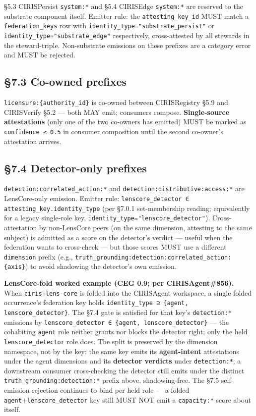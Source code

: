 \documentclass[10pt]{article}
\begin{document}
§5.3 CIRISPersist \texttt{system:*} and §5.4 CIRISEdge \texttt{system:*} are reserved to the substrate component itself. Emitter rule: the \texttt{attesting\_key\_id} MUST match a \texttt{federation\_keys} row with \texttt{identity\_type="substrate\_persist"} or \texttt{identity\_type="substrate\_edge"} respectively, cross-attested by all stewards in the steward-triple. Non-substrate emissions on these prefixes are a category error and MUST be rejected.


\subsection*{§7.3 Co-owned prefixes}


\texttt{licensure:\{authority\_id\}} is co-owned between CIRISRegistry §5.9 and CIRISVerify §5.2 — both MAY emit; consumers compose. \textbf{Single-source attestations} (only one of the two co-owners has emitted) MUST be marked as \texttt{confidence ≤ 0.5} in consumer composition until the second co-owner's attestation arrives.


\subsection*{§7.4 Detector-only prefixes}


\texttt{detection:correlated\_action:*} and \texttt{detection:distributive:access:*} are LensCore-only emission. Emitter rule: \texttt{lenscore\_detector ∈ attesting\_key.identity\_type} (per §7.0.1 set-membership reading; equivalently for a legacy single-role key, \texttt{identity\_type="lenscore\_detector"}). Cross-attestation by non-LensCore peers (on the same dimension, attesting to the same subject) is admitted as a score on the detector's verdict — useful when the federation wants to cross-check — but those scores MUST use a different \texttt{dimension} prefix (e.g., \texttt{truth\_grounding:detection:correlated\_action:\{axis\}}) to avoid shadowing the detector's own emission.


\textbf{LensCore-fold worked example (CEG 0.9; per CIRISAgent\#856).} When \texttt{ciris-lens-core} is folded into the CIRISAgent workspace, a single folded occurrence's federation key holds \texttt{identity\_type ⊇ \{agent, lenscore\_detector\}}. The §7.4 gate is satisfied for that key's \texttt{detection:*} emissions by \texttt{lenscore\_detector ∈ \{agent, lenscore\_detector\}} — the cohabiting \texttt{agent} role neither grants nor blocks the detector right; only the held \texttt{lenscore\_detector} role does. The split is preserved by the dimension namespace, not by the key: the same key emits its \textbf{agent-intent} attestations under the agent dimensions and its \textbf{detector verdicts} under \texttt{detection:*}; a downstream consumer cross-checking the detector still emits under the distinct \texttt{truth\_grounding:detection:*} prefix above, shadowing-free. The §7.5 self-emission rejection continues to bind per held role — a folded \texttt{agent}+\texttt{lenscore\_detector} key still MUST NOT emit a \texttt{capacity:*} score about itself.
\end{document}
